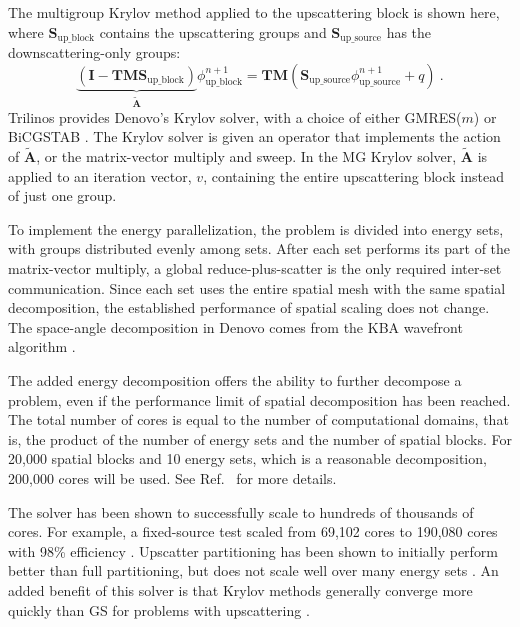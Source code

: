\documentclass[preprint,12pt]{elsarticle}
\newcommand{\ve}[1]{\ensuremath{\mathbf{#1}}}
\begin{document}
The multigroup Krylov method applied to the upscattering block is shown here, where $\ve{S}_{\text{up\_block}}$ contains the upscattering groups and $\ve{S}_{\text{up\_source}}$ has the downscattering-only groups:
%
\begin{equation}
  \underbrace{(\ve{I} - \ve{TMS}_{\text{up\_block}})}_{\tilde{\ve{A}}}\phi_{\text{up\_block}}^{n+1} = \ve{TM}(\ve{S}_{\text{up\_source}}\phi_{\text{up\_source}}^{n+1} + q) \:.
  \label{eq:MGkrylov}
\end{equation}
%
Trilinos \cite{1089021} provides Denovo's Krylov solver, with a choice of either GMRES($m$) or BiCGSTAB \cite{Evans2010}. The Krylov solver is given an operator that implements the action of $\ve{\tilde{A}}$, or the matrix-vector multiply and sweep. In the MG Krylov solver, $\ve{\tilde{A}}$ is applied to an iteration vector, $v$, containing the entire upscattering block instead of just one group.%
%

To implement the energy parallelization, the problem is divided into energy sets, with groups distributed evenly among sets. After each set performs its part of the matrix-vector multiply, a global reduce-plus-scatter is the only required inter-set communication. Since each set uses the entire spatial mesh with the same spatial decomposition, the established performance of spatial scaling does not change. The space-angle decomposition in Denovo comes from the KBA wavefront algorithm \cite{Baker1998}. %

The added energy decomposition offers the ability to further decompose a problem, even if the performance limit of spatial decomposition has been reached. The total number of cores is equal to the number of computational domains, that is, the product of the number of energy sets and the number of spatial blocks. For 20,000 spatial blocks and 10 energy sets, which is a reasonable decomposition, 200,000 cores will be used. See Ref.\ \cite{Evans2011} for more details. 

The solver has been shown to successfully scale to hundreds of thousands of cores. For example, a fixed-source test scaled from 69,102 cores to 190,080 cores with 98\% efficiency \cite{Slaybaugh2011}. Upscatter partitioning has been shown to initially perform better than full partitioning, but does not scale well over many energy sets \cite{Davidson2013}. An added benefit of this solver is that Krylov methods generally converge more quickly than GS for problems with upscattering \cite{Trefethen1997}.
\end{document}
